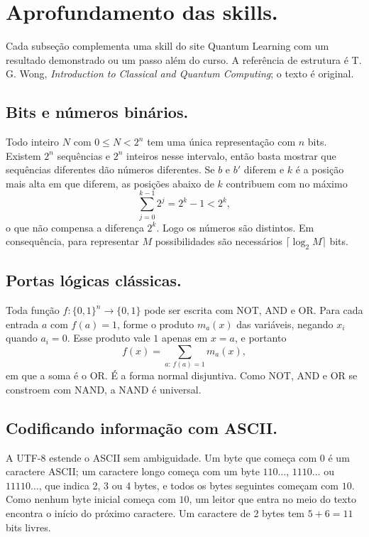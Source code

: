 \newpage
\section{Aprofundamento das skills.}
Cada subseção complementa uma skill do site Quantum Learning com um resultado demonstrado ou um passo além do curso. A referência de estrutura é T. G. Wong, \textit{Introduction to Classical and Quantum Computing}; o texto é original.

\subsection{Bits e números binários.}
Todo inteiro $N$ com $0 \le N < 2^n$ tem uma única representação com $n$ bits. Existem $2^n$ sequências e $2^n$ inteiros nesse intervalo, então basta mostrar que sequências diferentes dão números diferentes. Se $b$ e $b'$ diferem e $k$ é a posição mais alta em que diferem, as posições abaixo de $k$ contribuem com no máximo
\begin{equation}
    \sum_{j=0}^{k-1} 2^j = 2^k - 1 < 2^k,
\end{equation}
o que não compensa a diferença $2^k$. Logo os números são distintos. Em consequência, para representar $M$ possibilidades são necessários $\lceil \log_2 M \rceil$ bits.

\subsection{Portas lógicas clássicas.}
Toda função $f:\{0,1\}^n \to \{0,1\}$ pode ser escrita com NOT, AND e OR. Para cada entrada $a$ com $f(a)=1$, forme o produto $m_a(x)$ das variáveis, negando $x_i$ quando $a_i = 0$. Esse produto vale $1$ apenas em $x=a$, e portanto
\begin{equation}
    f(x) = \sum_{a:\,f(a)=1} m_a(x),
\end{equation}
em que a soma é o OR. É a forma normal disjuntiva. Como NOT, AND e OR se constroem com NAND, a NAND é universal.

\subsection{Codificando informação com ASCII.}
A UTF-8 estende o ASCII sem ambiguidade. Um byte que começa com $0$ é um caractere ASCII; um caractere longo começa com um byte $110\ldots$, $1110\ldots$ ou $11110\ldots$, que indica 2, 3 ou 4 bytes, e todos os bytes seguintes começam com $10$. Como nenhum byte inicial começa com $10$, um leitor que entra no meio do texto encontra o início do próximo caractere. Um caractere de 2 bytes tem $5 + 6 = 11$ bits livres.

